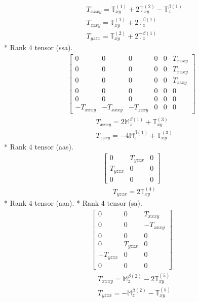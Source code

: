 \documentclass[fleqn,8pt,landscape]{jsarticle}
\begin{document}
\begin{align*}
& T_{xxxy} = \mathbb{T}_{xy}^{(1)} + 2 \mathbb{T}_{xy}^{(2)} - \mathbb{T}_{z}^{\beta(1)} \\
& T_{zzxy} = \mathbb{T}_{xy}^{(1)} + 2 \mathbb{T}_{z}^{\beta(1)} \\
& T_{yzzx} = \mathbb{T}_{xy}^{(2)} + 2 \mathbb{T}_{z}^{\beta(1)}
\end{align*}
* Rank 4 tensor (ssa).
\begin{align*}
\begin{bmatrix} 0 & 0 & 0 & 0 & 0 & T_{xxxy} \\ 0 & 0 & 0 & 0 & 0 & T_{xxxy} \\ 0 & 0 & 0 & 0 & 0 & T_{zzxy} \\ 0 & 0 & 0 & 0 & 0 & 0 \\ 0 & 0 & 0 & 0 & 0 & 0 \\ - T_{xxxy} & - T_{xxxy} & - T_{zzxy} & 0 & 0 & 0 \end{bmatrix}
\end{align*}
\begin{align*}
& T_{xxxy} = 2 \mathbb{M}_{z}^{\beta(1)} + \mathbb{T}_{xy}^{(3)} \\
& T_{zzxy} = - 4 \mathbb{M}_{z}^{\beta(1)} + \mathbb{T}_{xy}^{(3)}
\end{align*}
* Rank 4 tensor (aas).
\begin{align*}
\begin{bmatrix} 0 & T_{yzzx} & 0 \\ T_{yzzx} & 0 & 0 \\ 0 & 0 & 0 \end{bmatrix}
\end{align*}
\begin{align*}
& T_{yzzx} = 2 \mathbb{T}_{xy}^{(4)}
\end{align*}
* Rank 4 tensor (aaa).
* Rank 4 tensor (sa).
\begin{align*}
\begin{bmatrix} 0 & 0 & T_{xxxy} \\ 0 & 0 & - T_{xxxy} \\ 0 & 0 & 0 \\ 0 & T_{yzzx} & 0 \\ - T_{yzzx} & 0 & 0 \\ 0 & 0 & 0 \end{bmatrix}
\end{align*}
\begin{align*}
& T_{xxxy} = \mathbb{M}_{z}^{\beta(2)} - 2 \mathbb{T}_{xy}^{(5)} \\
& T_{yzzx} = - \mathbb{M}_{z}^{\beta(2)} - \mathbb{T}_{xy}^{(5)}
\end{align*}
\end{document}
